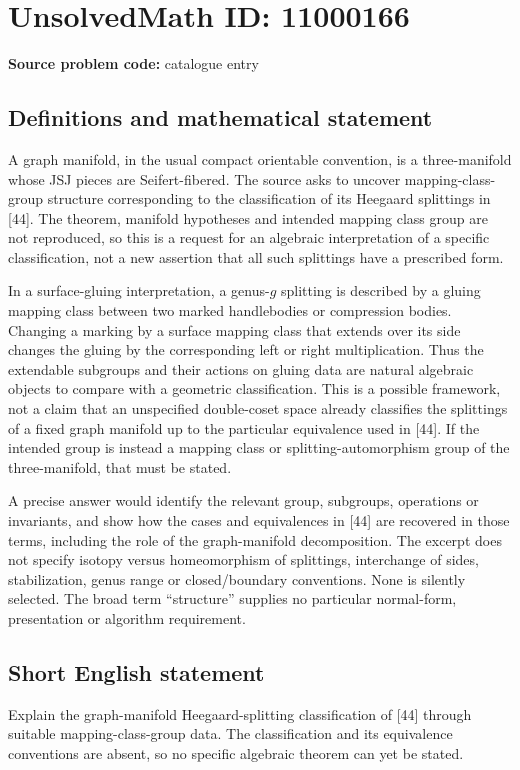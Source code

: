 \documentclass[11pt]{article}
\begin{document}
\section*{UnsolvedMath ID: 11000166}
\textbf{Source problem code:} catalogue entry
\subsection{Definitions and mathematical statement}
A graph manifold, in the usual compact orientable convention, is a three-manifold whose JSJ pieces are Seifert-fibered. The source asks to uncover mapping-class-group structure corresponding to the classification of its Heegaard splittings in [44]. The theorem, manifold hypotheses and intended mapping class group are not reproduced, so this is a request for an algebraic interpretation of a specific classification, not a new assertion that all such splittings have a prescribed form.

In a surface-gluing interpretation, a genus-\(g\) splitting is described by a gluing mapping class between two marked handlebodies or compression bodies. Changing a marking by a surface mapping class that extends over its side changes the gluing by the corresponding left or right multiplication. Thus the extendable subgroups and their actions on gluing data are natural algebraic objects to compare with a geometric classification. This is a possible framework, not a claim that an unspecified double-coset space already classifies the splittings of a fixed graph manifold up to the particular equivalence used in [44]. If the intended group is instead a mapping class or splitting-automorphism group of the three-manifold, that must be stated.

A precise answer would identify the relevant group, subgroups, operations or invariants, and show how the cases and equivalences in [44] are recovered in those terms, including the role of the graph-manifold decomposition. The excerpt does not specify isotopy versus homeomorphism of splittings, interchange of sides, stabilization, genus range or closed/boundary conventions. None is silently selected. The broad term ``structure'' supplies no particular normal-form, presentation or algorithm requirement.
\subsection{Short English statement}
Explain the graph-manifold Heegaard-splitting classification of [44] through suitable mapping-class-group data. The classification and its equivalence conventions are absent, so no specific algebraic theorem can yet be stated.
\end{document}
